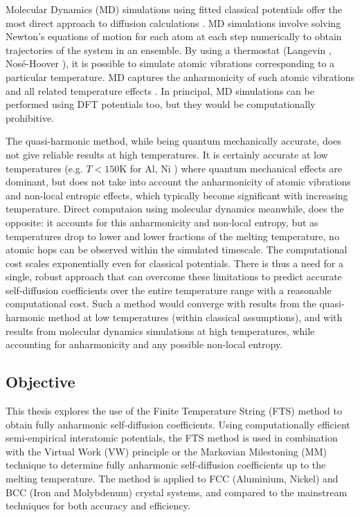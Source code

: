 \documentclass{article}
\begin{document}
Molecular Dynamics (MD) simulations using fitted classical potentials offer the most direct approach to diffusion calculations \cite{Kaur1995}. MD simulations involve solving Newton's equations of motion for each atom at each step numerically to obtain trajectories of the system in an ensemble. By using a thermostat (Langevin \cite{Davidchack2009}, Nosé-Hoover \cite{Evans1985}), it is possible to simulate atomic vibrations corresponding to a particular temperature. MD captures the anharmonicity of such atomic vibrations and all related temperature effects \cite{Mendelev2009}. In principal, MD simulations can be performed using DFT potentials too, but they would be computationally prohibitive.

The quasi-harmonic method, while being quantum mechanically accurate, does not give reliable results at high temperatures. It is certainly accurate at low temperatures (e.g. $T<150$K for Al, Ni \cite{Maradudin1963}) where quantum mechanical effects are dominant, but does not take into account the anharmonicity of atomic vibrations and non-local entropic effects, which typically become significant with increasing temperature. Direct computaion using molecular dynamics meanwhile, does the opposite: it accounts for this anharmonicity and non-local entropy, but as temperatures drop to lower and lower fractions of the melting temperature, no atomic hops can be observed within the simulated timescale. The computational cost scales exponentially even for classical potentials. There is thus a need for a single, robust approach that can overcome these limitations to predict accurate self-diffusion coefficients over the entire temperature range with a reasonable computational cost. Such a method would converge with results from the quasi-harmonic method at low temperatures (within classical assumptions), and with results from molecular dynamics simulations at high temperatures, while accounting for anharmonicity and any possible non-local entropy. 

\subsection{Objective}

This thesis explores the use of the Finite Temperature String (FTS) method \cite{Vanden-Eijnden2009} to obtain fully anharmonic self-diffusion coefficients. Using computationally efficient semi-empirical interatomic potentials, the FTS method is used in combination with the Virtual Work (VW) principle \cite{Swinburne2017} or the Markovian Milestoning (MM) technique \cite{Vanden-Eijnden2009a} to determine fully anharmonic self-diffusion coefficients up to the melting temperature. The method is applied to FCC (Aluminium, Nickel) and BCC (Iron and Molybdenum) crystal systems, and compared to the mainstream techniques for both accuracy and efficiency.
\end{document}
